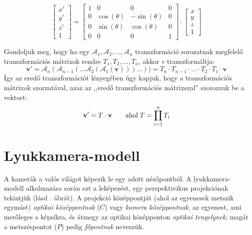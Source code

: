 \[\left[\begin{array}{c}x' \\y' \\z' \\ 1 \end{array}\right] = \left[\begin{array}{cccc}1 & 0 & 0 & 0\\0 & \cos (\theta) & -\sin (\theta) & 0\\ 0 & \sin(\theta) & \cos(\theta) & 0 \\ 0 & 0 & 0 & 1\end{array}\right] \cdot \left[\begin{array}{c}x \\y \\ z\\ 1 \end{array}\right]\]

Gondoljuk meg, hogy ha egy $\mathcal{A}_1, \mathcal{A}_2, \ldots, \mathcal{A}_n$ transzformáció sorozatnak megfelelő transzformációs mátrixok rendre $T_1, T_2, \ldots, T_n$, akkor $v$ transzformáltja:
\[\mathbf{v}' = \mathcal{A}_n(\mathcal{A}_{n-1}(\ldots \mathcal{A}_2(\mathcal{A}_1(\mathbf{v})))\ldots)) = T_n \cdot T_{n-1} \cdot \ldots \cdot T_2 \cdot T_1 \cdot \mathbf{v}\]
Így az eredő transzformációt lényegében úgy kapjuk, hogy a transzformációs mátrixok szorzatával, azaz az ,,eredő transzformációs mátrixszal'' szorozzuk be a vektort:
\[\mathbf{v}' = T \cdot \mathbf{v} \qquad \hbox{ahol} \; T = \prod_{i=1}^{n}{T_i}\]

\section{Lyukkamera-modell \label{sec:pinhole}}

A kamerák a valós világot képezik le egy adott nézőpontból. A lyukkamera-modell alkalmazása során ezt a leképezést, egy perspektivikus projekciónak tekintjük \cite[2.2. fejezet]{pinhole-model} (lásd . ábrát). A projekció középpontját (ahol az egyenesek metszik egymást) \textit{optikai középpontnak} ($C$) vagy \textit{kamera középpontnak}, az egyenest, ami merőleges a képsíkra, és átmegy az optikai középponton \textit{optikai tengelynek}, magát a metszéspontot ($P$) pedig \textit{főpontnak} nevezzük.

